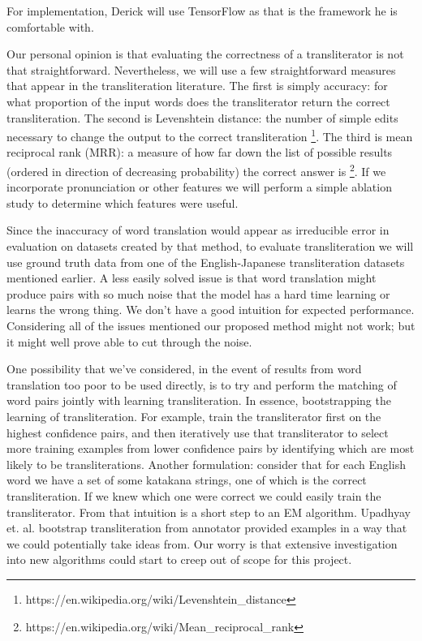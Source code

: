 \documentclass{article}
\begin{document}
For implementation,
Derick will use TensorFlow as that is the framework he is comfortable with.

Our personal opinion is that evaluating the correctness
of a transliterator is not that straightforward.
Nevertheless,
we will use a few straightforward measures
that appear in the transliteration literature.
The first is simply accuracy:
for what proportion of the input words
does the transliterator return the correct transliteration.
The second is Levenshtein distance:
the number of simple edits necessary to change the output to
the correct transliteration
\footnote{https://en.wikipedia.org/wiki/Levenshtein\_distance}.
The third is mean reciprocal rank (MRR):
a measure of how far down the list of possible results
(ordered in direction of decreasing probability)
the correct answer is
\footnote{https://en.wikipedia.org/wiki/Mean\_reciprocal\_rank}.
If we incorporate pronunciation or other features
we will perform a simple ablation study
to determine which features were useful.

Since the inaccuracy of word translation would appear as irreducible error
in evaluation on datasets created by that method,
to evaluate transliteration we will use ground truth data
from one of the English-Japanese transliteration datasets mentioned earlier.
A less easily solved issue is that
word translation might produce pairs with so much noise
that the model has a hard time learning or learns the wrong thing.
We don't have a good intuition for expected performance.
Considering all of the issues mentioned our proposed method might not work;
but it might well prove able to cut through the noise.

One possibility that we've considered,
in the event of results from word translation too poor to be used directly,
is to try and perform the matching of word pairs
jointly with learning transliteration.
In essence, bootstrapping the learning of transliteration.
For example,
train the transliterator first on the highest confidence pairs,
and then iteratively use that transliterator
to select more training examples from lower confidence pairs
by identifying which are most likely to be transliterations.
Another formulation:
consider that for each English word
we have a set of some katakana strings,
one of which is the correct transliteration.
If we knew which one were correct we could easily train the transliterator.
From that intuition is a short step to an EM algorithm.
Upadhyay et. al. \cite{Upadhyay2018BootstrappingTW}
bootstrap transliteration from annotator provided examples
in a way that we could potentially take ideas from.
Our worry is that extensive investigation into new algorithms
could start to creep out of scope for this project.
\end{document}
